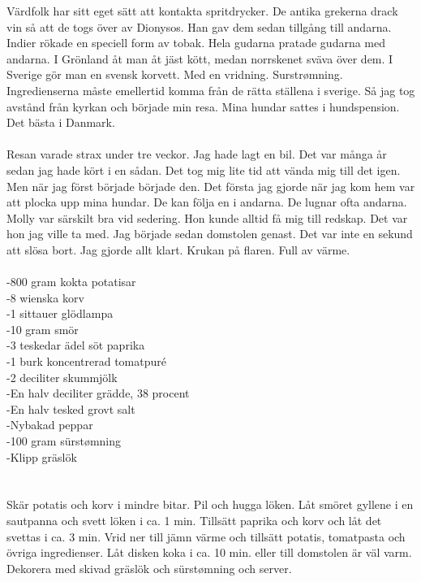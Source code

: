 \documentclass[]{article}
\begin{document}
Värdfolk har sitt eget sätt att kontakta spritdrycker. De antika grekerna drack vin så att de togs över av Dionysos. Han gav dem sedan tillgång till andarna. Indier rökade en speciell form av tobak. Hela gudarna pratade gudarna med andarna. I Grönland åt man åt jäst kött, medan norrskenet sväva över dem. I Sverige gör man en svensk korvett. Med en vridning. Surstrømning. Ingredienserna måste emellertid komma från de rätta ställena i sverige. Så jag tog avstånd från kyrkan och började min resa. Mina hundar sattes i hundspension. Det bästa i Danmark.
\\ \\
Resan varade strax under tre veckor. Jag hade lagt en bil. Det var många år sedan jag hade kört i en sådan. Det tog mig lite tid att vända mig till det igen. Men när jag först började började den. Det första jag gjorde när jag kom hem var att plocka upp mina hundar. De kan följa en i andarna. De lugnar ofta andarna. Molly var särskilt bra vid sedering. Hon kunde alltid få mig till redskap. Det var hon jag ville ta med. Jag började sedan domstolen genast. Det var inte en sekund att slösa bort. Jag gjorde allt klart. Krukan på flaren. Full av värme.
\\ \\
-800 gram kokta potatisar \\
-8 wienska korv \\
-1 sittauer glödlampa \\
-10 gram smör \\
-3 teskedar ädel söt paprika \\
-1 burk koncentrerad tomatpuré \\
-2 deciliter skummjölk \\
-En halv deciliter grädde, 38 procent \\
-En halv tesked grovt salt \\
-Nybakad peppar \\
-100 gram sürstømning \\
-Klipp gräslök \\
\\ \\
Skär potatis och korv i mindre bitar. Pil och hugga löken. Låt smöret gyllene i en sautpanna och svett löken i ca. 1 min. Tillsätt paprika och korv och låt det svettas i ca. 3 min. Vrid ner till jämn värme och tillsätt potatis, tomatpasta och övriga ingredienser. Låt disken koka i ca. 10 min. eller till domstolen är väl varm. Dekorera med skivad gräslök och sürstømning och server.
\\ \\
\end{document}
